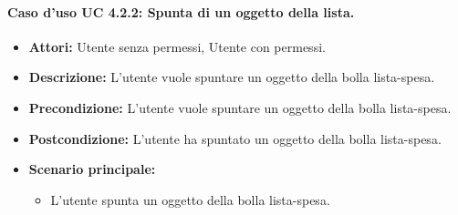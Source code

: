 \paragraph{Caso d'uso UC 4.2.2: Spunta di un oggetto della lista.}
\label{Caso d'uso UC 4.2.2: Spunta di un oggetto della lista.}

\FloatBarrier
\begin{itemize}
\item \textbf{Attori:} Utente senza permessi, Utente con permessi.
\item \textbf{Descrizione:} L'utente vuole spuntare un oggetto della bolla lista-spesa.
\item \textbf{Precondizione:} L'utente vuole spuntare un oggetto della bolla lista-spesa. 
\item \textbf{Postcondizione:} L'utente ha spuntato un oggetto della bolla lista-spesa.
\item \textbf{Scenario principale:}
	\begin{itemize}
	\item{L'utente spunta un oggetto della bolla lista-spesa.}
	\end{itemize}
\end{itemize}